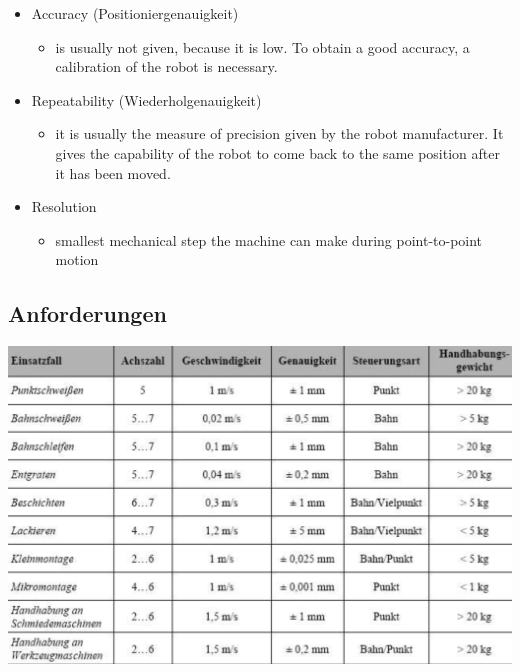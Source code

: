 \begin{multicols}{2}
\begin{itemize}
\begin{itemize}
    \end{itemize}
    \item Accuracy (Positioniergenauigkeit)
    \begin{itemize}
        \item is usually not given, because it is low. To obtain a good accuracy, a calibration of the robot is necessary.
    \end{itemize}
    \item Repeatability (Wiederholgenauigkeit)
    \begin{itemize}
        \item it is usually the measure of precision given by the robot manufacturer. It gives the capability of the robot to come back to the same position after it has been moved.
    \end{itemize}
    \item Resolution
    \begin{itemize}
        \item smallest mechanical step the machine can make during point-to-point motion
    \end{itemize}
\end{itemize}
\end{multicols}
\enlargethispage{1cm}
\begin{minipage}{0.5\linewidth}
\subsection{Anforderungen}
\includegraphics[width=\linewidth]{./bilder/anforderung}
\end{minipage}
